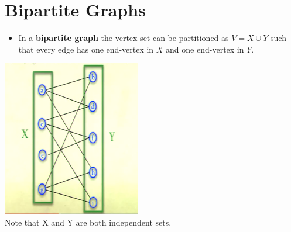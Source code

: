 \documentclass[12pt]{article}
\begin{document}
\section{Bipartite Graphs}
\renewcommand{\labelitemii}{$\circ$}
\renewcommand{\labelitemiii}{$\cdot$}
\renewcommand{\labelitemiii}{$\rightarrow$}
\renewcommand{\labelitemiv}{$\star$}
\begin{itemize}
\item In a \textbf{bipartite graph} the vertex set can be partitioned as $V = X \cup Y$ such that every edge has one end-vertex in $X$ and one end-vertex in $Y$.
\end{itemize}
\begin{center}
\includegraphics{lecture719}\\
Note that X and Y are both independent sets.
\end{center}
\end{document}

